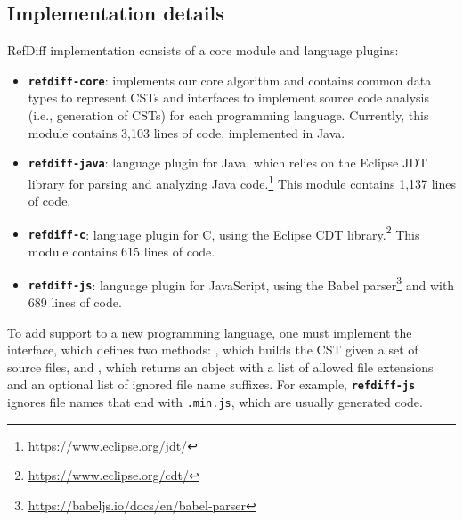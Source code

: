 \subsection{Implementation details}

RefDiff implementation consists of a core module and language plugins:

\begin{itemize}
\item \textbf{\texttt{refdiff-core}}: implements our core algorithm and contains common data types to represent CSTs and interfaces to implement source code analysis (i.e., generation of CSTs) for each programming language. Currently, this module contains 3,103 lines of code, implemented in Java.

\item \textbf{\texttt{refdiff-java}}: language plugin for Java, which relies on the Eclipse JDT library for parsing and analyzing Java code.\footnote{\url{https://www.eclipse.org/jdt/}}
This module contains 1,137 lines of code.
\item \textbf{\texttt{refdiff-c}}: language plugin for C, using the Eclipse CDT library.\footnote{\url{https://www.eclipse.org/cdt/}}
This module contains 615 lines of code.
\item \textbf{\texttt{refdiff-js}}: language plugin for JavaScript, using the Babel parser\footnote{\url{https://babeljs.io/docs/en/babel-parser}}
and with 689 lines of code.
\end{itemize}
To add support to a new programming language, one must implement the   interface, which defines two methods: , which builds the CST given a set of source files, and , which returns an object with a list of allowed file extensions and an optional list of ignored file name suffixes. For example, \textbf{\texttt{refdiff-js}} ignores file names that end with \texttt{.min.js}, which are usually generated code.

